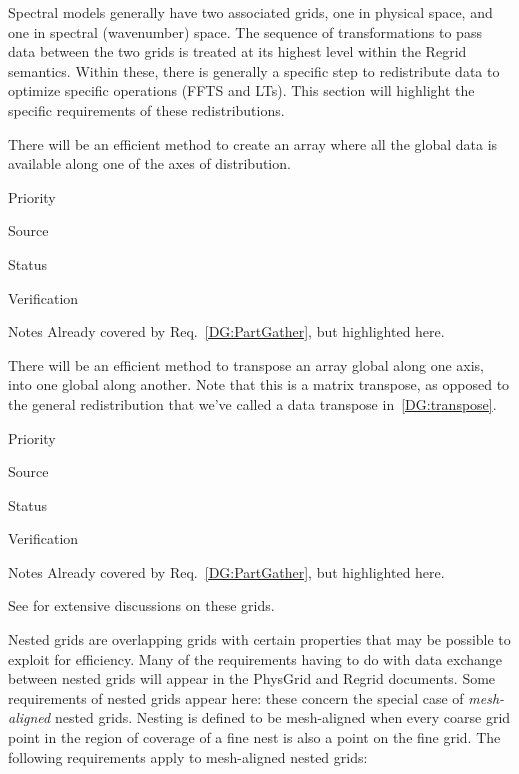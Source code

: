 
Spectral models generally have two associated grids, one in physical
space, and one in spectral (wavenumber) space. The sequence of
transformations to pass data between the two grids is treated at its
highest level within the Regrid semantics. Within these, there is
generally a specific step to redistribute data to optimize specific
operations (FFTS and LTs). This section will highlight the specific
requirements of these redistributions.


There will be an efficient method to create an array where all the
global data is available along one of the axes of distribution.

\begin{reqlist}
\item[Priority]
\item[Source]
\item[Status]
\item[Verification]
\item[Notes] Already covered by Req.~\ref{DG:PartGather}, but
  highlighted here.
\end{reqlist}


There will be an efficient method to transpose an array global along
one axis, into one global along another. Note that this is a matrix
transpose, as opposed to the general redistribution that we've called
a data transpose in~\ref{DG:transpose}.

\begin{reqlist}
\item[Priority]
\item[Source]
\item[Status]
\item[Verification]
\item[Notes] Already covered by Req.~\ref{DG:PartGather}, but
  highlighted here.
\end{reqlist}



See \cite{art:heikes+:geodesic,art:majewski+:gme} for extensive
discussions on these grids.



Nested grids are overlapping grids with certain properties that may be
possible to exploit for efficiency. Many of the requirements having to
do with data exchange between nested grids will appear in the PhysGrid
and Regrid documents. Some requirements of nested grids appear here:
these concern the special case of \emph{mesh-aligned} nested
grids. Nesting is defined to be mesh-aligned when every coarse grid
point in the region of coverage of a fine nest is also a point on the
fine grid. The following requirements apply to mesh-aligned nested
grids:

